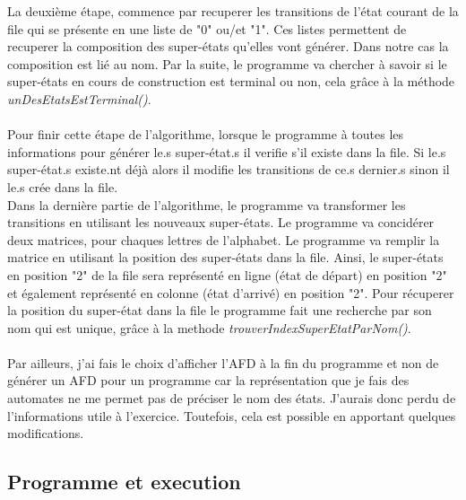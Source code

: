 \documentclass[a4paper]{article}
\begin{document}
La deuxième étape, commence par recuperer les transitions de 
l'état courant de la file qui se présente en une liste de "0" ou/et "1".
Ces listes permettent de recuperer la composition des super-états qu'elles vont
générer. Dans notre cas la composition est lié au nom. Par la suite, le programme va 
chercher à savoir si le super-états en cours de construction est terminal ou non, cela
grâce à la méthode \textit{unDesEtatsEstTerminal()}.\\

\fbox{
	
}\\

Pour finir cette étape de l'algorithme, lorsque le programme à toutes les informations pour générer le.s super-état.s il 
verifie s'il existe dans la file. Si le.s super-état.s existe.nt déjà alors il modifie les 
transitions de ce.s dernier.s sinon il le.s crée dans la file.\\ 

Dans la dernière partie de l'algorithme, le programme va transformer les transitions en utilisant
les nouveaux super-états. Le programme va concidérer deux matrices, pour chaques lettres
de l'alphabet. Le programme va remplir la matrice en utilisant la position des super-états
dans la file. Ainsi, le super-états en position "2" de la file sera représenté en ligne
(état de départ) en position "2" et également représenté en colonne (état d'arrivé) en 
position "2". Pour récuperer la position du super-état dans la file le programme fait une
recherche par son nom qui est unique, grâce à la methode \textit{trouverIndexSuperEtatParNom()}.\\

\fbox{
	
}\\

Par ailleurs, j'ai fais le choix d'afficher l'AFD à la fin du programme et non de générer un AFD pour un programme car
la représentation que je fais des automates ne me permet pas de préciser le nom des états. J'aurais
donc perdu de l'informations utile à l'exercice. Toutefois, cela est possible en apportant quelques 
modifications.\\


\subsection{Programme et execution}
\end{document}

